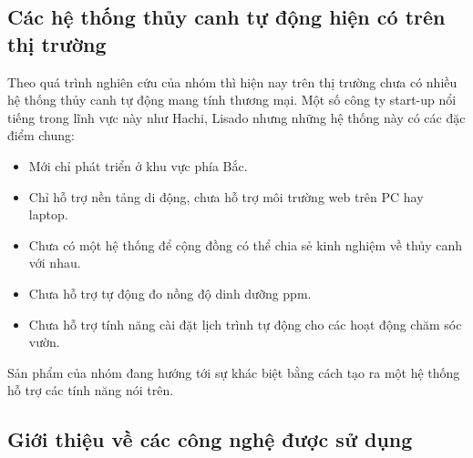\documentclass[a4paper,12pt,oneside]{article}
\begin{document}
\subsection{Các hệ thống thủy canh tự động hiện có trên thị trường}
\noindent Theo quá trình nghiên cứu của nhóm thì hiện nay trên thị trường chưa có nhiều hệ thống thủy canh tự động mang tính thương mại. Một số công ty start-up nổi tiếng trong lĩnh vực này như Hachi, Lisado nhưng những hệ thống này có các đặc điểm chung:
	\begin{itemize}
		\item Mới chỉ phát triển ở khu vực phía Bắc.
		\item Chỉ hỗ trợ nền tảng di động, chưa hỗ trợ môi trường web trên PC hay laptop.
		\item Chưa có một hệ thống để cộng đồng có thể chia sẻ kinh nghiệm về thủy canh với nhau.
		\item Chưa hỗ trợ tự động đo nồng độ dinh dưỡng ppm.
		\item Chưa hỗ trợ tính năng cài đặt lịch trình tự động cho các hoạt động chăm sóc vườn.
	\end{itemize} 
\noindent Sản phẩm của nhóm đang hướng tới sự khác biệt bằng cách tạo ra một hệ thống hỗ trợ các tính năng nói trên.
\subsection{Giới thiệu về các công nghệ được sử dụng}
\end{document}
